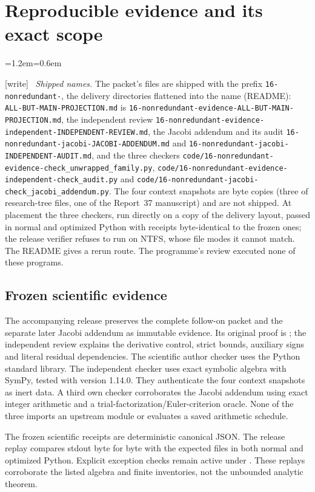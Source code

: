 \documentclass[11pt,letterpaper]{article}
\theoremstyle{definition}\newtheorem{definition}[theorem]{Definition}
\theoremstyle{remark}\newtheorem{remark}[theorem]{Remark}
\newcommand{\code}[1]{\texttt{\detokenize{#1}}}
\newcommand{\wtag}{\textup{[write]}}
\newenvironment{writenote}{\par\smallskip\begin{list}{}{\leftmargin=1.2em\rightmargin=0.6em}\item[]\small\wtag\ }{\end{list}\smallskip}
\newcommand{\rw}[1]{\nolinkurl{#1}}%
\begin{document}
\section{Reproducible evidence and its exact scope}\label{fup:nr:sec:repro}
\begin{writenote}
\emph{Shipped names.} The packet's files are shipped with the prefix \texttt{16-nonredundant-}, the delivery directories flattened into the name (README): \rw{ALL-BUT-MAIN-PROJECTION.md} is \rw{16-nonredundant-evidence-ALL-BUT-MAIN-PROJECTION.md}, the independent review \rw{16-nonredundant-evidence-independent-INDEPENDENT-REVIEW.md}, the Jacobi addendum and its audit \rw{16-nonredundant-jacobi-JACOBI-ADDENDUM.md} and \rw{16-nonredundant-jacobi-INDEPENDENT-AUDIT.md}, and the three checkers \rw{code/16-nonredundant-evidence-check_unwrapped_family.py}, \rw{code/16-nonredundant-evidence-independent-check_audit.py} and \rw{code/16-nonredundant-jacobi-check_jacobi_addendum.py}. The four context snapshots are byte copies (three of research-tree files, one of the Report~37 manuscript) and are not shipped. At placement the three checkers, run directly on a copy of the delivery layout, passed in normal and optimized Python with receipts byte-identical to the frozen ones; the release verifier refuses to run on NTFS, whose file modes it cannot match. The README gives a rerun route. The programme's review executed none of these programs.
\end{writenote}
\subsection{Frozen scientific evidence}
The accompanying release preserves the complete follow-on packet and the separate later Jacobi addendum as immutable evidence. Its original proof is \code{ALL-BUT-MAIN-PROJECTION.md}; the independent review explains the derivative control, strict bounds, auxiliary signs and literal residual dependencies. The scientific author checker uses the Python standard library. The independent checker uses exact symbolic algebra with SymPy, tested with version 1.14.0. They authenticate the four context snapshots as inert data. A third own checker corroborates the Jacobi addendum using exact integer arithmetic and a trial-factorization/Euler-criterion oracle. None of the three imports an upstream module or evaluates a saved arithmetic schedule.

The frozen scientific receipts are deterministic canonical JSON. The release replay compares stdout byte for byte with the expected files in both normal and optimized Python. Explicit exception checks remain active under \code{-O}. These replays corroborate the listed algebra and finite inventories, not the unbounded analytic theorem.
\end{document}
